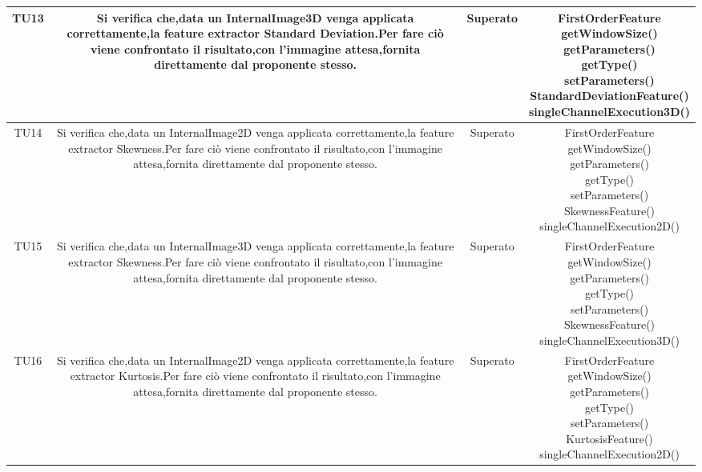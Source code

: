 \begin{center}
\begin{longtable}{|c|c|c|c|}
\hline
TU13 & \parbox[t]{\larghezza}{ Si verifica che,data un InternalImage3D venga applicata correttamente,la feature extractor Standard Deviation.Per fare ciò viene confrontato il risultato,con l'immagine attesa,fornita direttamente dal proponente stesso. } & Superato & \parbox[t]{\dimTipo} { FirstOrderFeature \\ getWindowSize() \\ getParameters() \\ getType() \\ setParameters() \\ StandardDeviationFeature() \\ singleChannelExecution3D() \\ } \\
\hline
TU14 & \parbox[t]{\larghezza}{ Si verifica che,data un InternalImage2D venga applicata correttamente,la feature extractor Skewness.Per fare ciò viene confrontato il risultato,con l'immagine attesa,fornita direttamente dal proponente stesso. } & Superato & \parbox[t]{\dimTipo} { FirstOrderFeature \\ getWindowSize() \\ getParameters() \\ getType() \\ setParameters() \\ SkewnessFeature() \\ singleChannelExecution2D() \\ } \\
\hline
TU15 & \parbox[t]{\larghezza}{ Si verifica che,data un InternalImage3D venga applicata correttamente,la feature extractor Skewness.Per fare ciò viene confrontato il risultato,con l'immagine attesa,fornita direttamente dal proponente stesso. } & Superato & \parbox[t]{\dimTipo} { FirstOrderFeature \\ getWindowSize() \\ getParameters() \\ getType() \\ setParameters() \\ SkewnessFeature() \\ singleChannelExecution3D() \\ } \\
\hline
TU16 & \parbox[t]{\larghezza}{ Si verifica che,data un InternalImage2D venga applicata correttamente,la feature extractor Kurtosis.Per fare ciò viene confrontato il risultato,con l'immagine attesa,fornita direttamente dal proponente stesso. } & Superato & \parbox[t]{\dimTipo} { FirstOrderFeature \\ getWindowSize() \\ getParameters() \\ getType() \\ setParameters() \\ KurtosisFeature() \\ singleChannelExecution2D() \\ } \\

\end{longtable}
\end{center}

